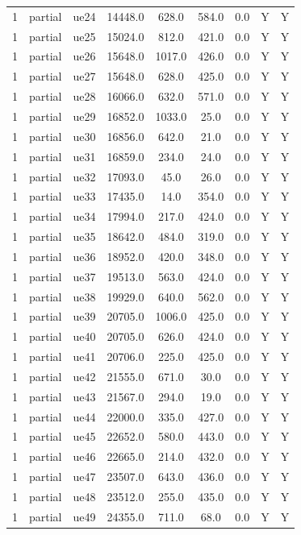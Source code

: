 \begin{table}[ht]
\begin{tabular}{|c|c|c|c|c|c|c|c|c|}
1 & partial & ue24 & 14448.0 & 628.0 & 584.0 & 0.0 & Y & Y \\
1 & partial & ue25 & 15024.0 & 812.0 & 421.0 & 0.0 & Y & Y \\
1 & partial & ue26 & 15648.0 & 1017.0 & 426.0 & 0.0 & Y & Y \\
1 & partial & ue27 & 15648.0 & 628.0 & 425.0 & 0.0 & Y & Y \\
1 & partial & ue28 & 16066.0 & 632.0 & 571.0 & 0.0 & Y & Y \\
1 & partial & ue29 & 16852.0 & 1033.0 & 25.0 & 0.0 & Y & Y \\
1 & partial & ue30 & 16856.0 & 642.0 & 21.0 & 0.0 & Y & Y \\
1 & partial & ue31 & 16859.0 & 234.0 & 24.0 & 0.0 & Y & Y \\
1 & partial & ue32 & 17093.0 & 45.0 & 26.0 & 0.0 & Y & Y \\
1 & partial & ue33 & 17435.0 & 14.0 & 354.0 & 0.0 & Y & Y \\
1 & partial & ue34 & 17994.0 & 217.0 & 424.0 & 0.0 & Y & Y \\
1 & partial & ue35 & 18642.0 & 484.0 & 319.0 & 0.0 & Y & Y \\
1 & partial & ue36 & 18952.0 & 420.0 & 348.0 & 0.0 & Y & Y \\
1 & partial & ue37 & 19513.0 & 563.0 & 424.0 & 0.0 & Y & Y \\
1 & partial & ue38 & 19929.0 & 640.0 & 562.0 & 0.0 & Y & Y \\
1 & partial & ue39 & 20705.0 & 1006.0 & 425.0 & 0.0 & Y & Y \\
1 & partial & ue40 & 20705.0 & 626.0 & 424.0 & 0.0 & Y & Y \\
1 & partial & ue41 & 20706.0 & 225.0 & 425.0 & 0.0 & Y & Y \\
1 & partial & ue42 & 21555.0 & 671.0 & 30.0 & 0.0 & Y & Y \\
1 & partial & ue43 & 21567.0 & 294.0 & 19.0 & 0.0 & Y & Y \\
1 & partial & ue44 & 22000.0 & 335.0 & 427.0 & 0.0 & Y & Y \\
1 & partial & ue45 & 22652.0 & 580.0 & 443.0 & 0.0 & Y & Y \\
1 & partial & ue46 & 22665.0 & 214.0 & 432.0 & 0.0 & Y & Y \\
1 & partial & ue47 & 23507.0 & 643.0 & 436.0 & 0.0 & Y & Y \\
1 & partial & ue48 & 23512.0 & 255.0 & 435.0 & 0.0 & Y & Y \\
1 & partial & ue49 & 24355.0 & 711.0 & 68.0 & 0.0 & Y & Y \\

\end{tabular}
\end{table}
